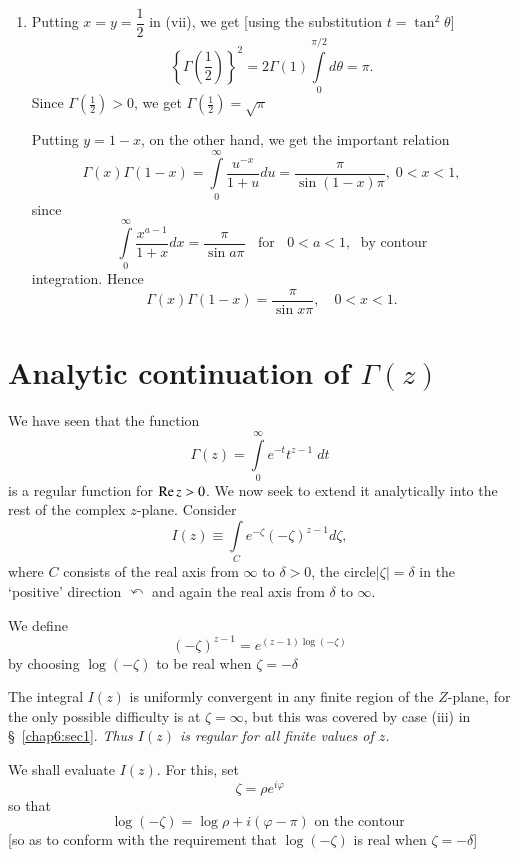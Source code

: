 \begin{enumerate}
The inversion\pageoriginale of the repeated integral is justified by
the use of the fact that the individual integrals converge uniformly
for $x \geq \epsilon >0$, $y \geq \epsilon > 0$.

\item Putting $x = y = \dfrac{1}{2}$ in (vii), we get [using the
  substitution $t = \tan^2 \theta$]
$$
\left\{\Gamma\left(\frac{1}{2}\right)\right\}^2 = 2 \Gamma (1) \int\limits^{\pi/2}_0 d\theta
= \pi.
$$
Since $\Gamma \left(\frac{1}{2}\right) > 0$, we get $\Gamma \left(\frac{1}{2}\right) = \sqrt{\pi}$

Putting $y = 1 -x$, on the other hand, we get the important relation 
$$
\Gamma (x) \Gamma (1-x) = \int\limits^\infty_0 \frac{u^{-x}}{1+u} du =
\frac{\pi}{\sin (1-x)\pi}, \; 0 < x < 1, 
$$
since 
$$
\int\limits^\infty_0 \frac{x^{a-1}}{1+x} dx = \frac{\pi}{\sin a\pi} 
\;\; \text{ for } \;\; 0 < a < 1, \; \text{  by contour}
$$
integration. Hence
$$
\Gamma (x) \Gamma (1-x) = \frac{\pi}{\sin x \pi}, \quad 0 < x< 1.
$$
\end{enumerate}


\section[Analytic continuation of $\Gamma (z)$]{Analytic continuation of {\boldmath$\Gamma (z)$} \protect \cite[p. 148]{key15}}\label{chap6:sec2} 

We have seen that the function
$$
\Gamma (z) = \int\limits^\infty_0 e^{-t} t^{z-1} \; dt
$$
is a regular function for $\operatorname{Re} z>0$. We now seek to extend it
analytically into the rest of the complex $z$-plane. Consider
$$
I(z) \equiv \int\limits_C e^{-\zeta} (-\zeta)^{z-1} d\zeta,
$$
where $C$ consists of the real axis from $\infty$ to $\delta >0$, the
circle\pageoriginale $|\zeta|=\delta$ in the `positive' direction
$\curvearrowleft$ and again the real axis from $\delta$ to $\infty$.

We define 
$$
(-\zeta)^{z-1} = e^{(z-1) \log (-\zeta)}
$$
by choosing $\log (-\zeta)$ to be real when $\zeta = - \delta$

The integral $I(z)$ is uniformly convergent in any finite region of
the $Z$-plane, for the only possible difficulty is at $\zeta =
\infty$, but this was covered by case (iii) in \S\ \ref{chap6:sec1}.  \textit{Thus
$I(z)$ is regular for all finite values of $z$.}

We shall evaluate $I(z)$. For this, set
$$
\zeta = \rho e^{i\varphi}
$$
so that
$$
\log (-\zeta) = \log \rho + i (\varphi - \pi) \text{ on the contour }
$$
[so as to conform with the requirement that $\log (-\zeta)$ is real
  when $\zeta = - \delta$]

